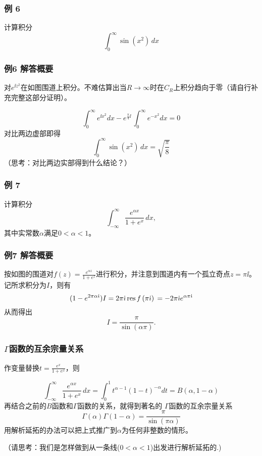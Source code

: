 \documentclass[CJK]{beamer}
\begin{document}
\begin{frame}
  \frametitle{例 6}
  
  
  计算积分 $$ \int_0^{\infty} \sin(x^2)\, dx $$
  
\end{frame}




\begin{frame}
  \frametitle{例6 解答概要}
  
  \emini
  对$e^{\ii z^2}$在如图围道上积分。不难估算出当$R\rightarrow \infty$时在$C_R$上积分趋向于零（请自行补充完整这部分证明）。
  \emini
  
  $$\int_0^\infty e^{\ii x^2} dx - e^{\frac{\pi}{4}\ii}\, \int_0^\infty e^{- x^2}dx  = 0 $$
  对比两边虚部即得
  $$ \int_0^{\infty} \sin(x^2)\,dx = \sqrt{\frac{\pi}{8}} $$ 
  {\scriptsize （思考：对比两边实部得到什么结论？）}
  
\end{frame}

\begin{frame}
  \frametitle{例 7}
  
  
  计算积分$$\int_{-\infty}^{\infty}\frac{e^{\alpha x}}{1+e^x} \, dx,$$
  其中实常数$\alpha$满足$0<\alpha<1$。

  
\end{frame}




\begin{frame}
  \frametitle{例7 解答概要}
  
  按如图的围道对$f(z) = \frac{e^{\alpha z}}{1+e^z}$进行积分，并注意到围道内有一个孤立奇点$z=\pi\ii$。 记所求积分为$I$，则有
  $$ (1 - e^{2\pi\alpha{\dot{\imath}}})I =2\pi{\dot{\imath}}\,\mathrm{res}\,f\left(\pi{\dot{\imath}}\right)\, =  -2\pi {\dot{\imath}} e^{\alpha\pi{\dot{\imath}}}$$
  从而得出
  $$I = \frac{\pi}{\sin(\alpha\pi)}.$$
  
\end{frame}



\begin{frame}
  \frametitle{$\Gamma$函数的互余宗量关系}
  
  作变量替换$t =  \frac{e^x}{1+e^x}$，则

  $$ \int_{-\infty}^{\infty}\frac{e^{\alpha x}}{1+e^x} \, dx = \int_0^1 t^{\alpha-1}(1-t)^{-\alpha} dt = B(\alpha, 1-\alpha) $$
  再结合之前的$B$函数和$\Gamma$函数的关系，就得到著名的{\blue
    $\Gamma$函数的互余宗量关系
    $$\Gamma(\alpha)\Gamma(1-\alpha) = \frac{\pi}{\sin(\pi\alpha)}$$
  }
  用解析延拓的办法可以把上式推广到$\alpha$为任何非整数的情形。
  
 {\scriptsize （请思考：我们是怎样做到从一条线($0<\alpha<1$)出发进行解析延拓的.) }
  
\end{frame}
\end{document}
